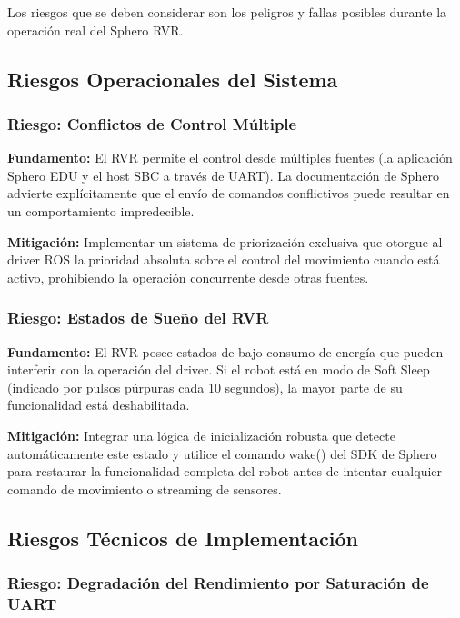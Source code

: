 \documentclass[11pt]{article}
\newcommand{\code}[1]{\textcolor{codeblue}{\url{#1}}}
\numberwithin{figure}{section}
\numberwithin{table}{section}
\def\code#1{#1}%
\begin{document}
Los riesgos que se deben considerar son los peligros y fallas posibles durante la operación real del Sphero RVR.


\subsection{Riesgos Operacionales del Sistema}


\subsubsection{Riesgo: Conflictos de Control Múltiple}

\textbf{Fundamento:} El RVR permite el control desde múltiples fuentes (la aplicación Sphero EDU y el host SBC a través de UART). La documentación de Sphero advierte explícitamente que el envío de comandos conflictivos puede resultar en un comportamiento impredecible.

\textbf{Mitigación:} Implementar un sistema de priorización exclusiva que otorgue al driver ROS la prioridad absoluta sobre el control del movimiento cuando está activo, prohibiendo la operación concurrente desde otras fuentes.


\subsubsection{Riesgo: Estados de Sueño del RVR}

\textbf{Fundamento:} El RVR posee estados de bajo consumo de energía que pueden interferir con la operación del driver. Si el robot está en modo de Soft Sleep (indicado por pulsos púrpuras cada 10 segundos), la mayor parte de su funcionalidad está deshabilitada.

\textbf{Mitigación:} Integrar una lógica de inicialización robusta que detecte automáticamente este estado y utilice el comando \code{wake()} del SDK de Sphero para restaurar la funcionalidad completa del robot antes de intentar cualquier comando de movimiento o streaming de sensores.


\subsection{Riesgos Técnicos de Implementación}


\subsubsection{Riesgo: Degradación del Rendimiento por Saturación de UART}
\end{document}
